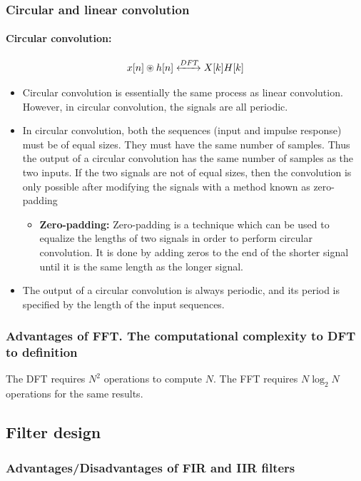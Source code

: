 \documentclass{article}
\begin{document}
\subsubsection{Circular and linear convolution}
\paragraph{Circular convolution:}
\begin{equation}
    x[n] \circledast h[n] \xleftrightarrow{DFT} X[k]H[k]
\end{equation}
\begin{itemize}
    \item Circular convolution is essentially the same process as linear convolution. However, in circular convolution, the signals are all periodic.
    \item In circular convolution, both the sequences (input and impulse response) must be of equal sizes. They must have the same number of samples. Thus the output of a circular convolution has the same number of samples as the two inputs. If the two signals are not of equal sizes, then the convolution is only possible after modifying the signals with a method known as zero-padding
    \begin{itemize}
        \item \textbf{Zero-padding:} Zero-padding is a technique which can be used to equalize the lengths of two signals in order to perform circular convolution. It is done by adding zeros to the end of the shorter signal until it is the same length as the longer signal.
    \end{itemize}
    \item The output of a circular convolution is always periodic, and its period is specified by the length of the input sequences.
\end{itemize}

\subsubsection{Advantages of FFT. The computational complexity to DFT to definition}

The DFT requires $N^2$ operations to compute $N$. The FFT requires $N \log_2 N$ operations for the same results.
\subsection{Filter design}

\subsubsection{Advantages/Disadvantages of FIR and IIR filters}
\end{document}
